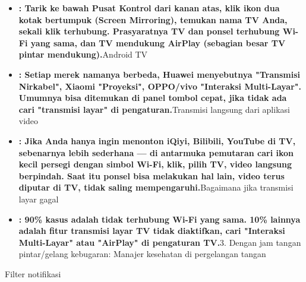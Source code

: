 \begin{itemize}
  \item \textbf{: Tarik ke bawah Pusat Kontrol dari kanan atas, klik ikon dua kotak bertumpuk (Screen Mirroring), temukan nama TV Anda, sekali klik terhubung. Prasyaratnya TV dan ponsel terhubung Wi-Fi yang sama, dan TV mendukung AirPlay (sebagian besar TV pintar mendukung).}Android TV
  \item \textbf{: Setiap merek namanya berbeda, Huawei menyebutnya "Transmisi Nirkabel", Xiaomi "Proyeksi", OPPO/vivo "Interaksi Multi-Layar". Umumnya bisa ditemukan di panel tombol cepat, jika tidak ada cari "transmisi layar" di pengaturan.}Transmisi langsung dari aplikasi video
  \item \textbf{: Jika Anda hanya ingin menonton iQiyi, Bilibili, YouTube di TV, sebenarnya lebih sederhana — di antarmuka pemutaran cari ikon kecil persegi dengan simbol Wi-Fi, klik, pilih TV, video langsung berpindah. Saat itu ponsel bisa melakukan hal lain, video terus diputar di TV, tidak saling mempengaruhi.}Bagaimana jika transmisi layar gagal
  \item \textbf{: 90\% kasus adalah tidak terhubung Wi-Fi yang sama. 10\% lainnya adalah fitur transmisi layar TV tidak diaktifkan, cari "Interaksi Multi-Layar" atau "AirPlay" di pengaturan TV.}3. Dengan jam tangan pintar/gelang kebugaran: Manajer kesehatan di pergelangan tangan
\end{itemize}


Filter notifikasi

